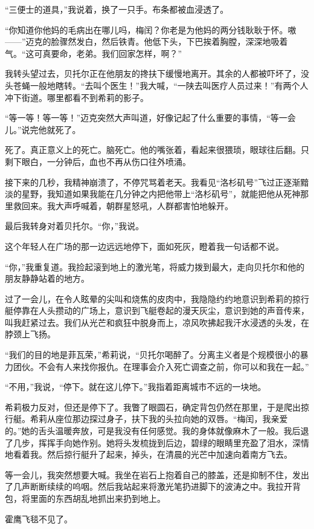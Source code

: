 \documentclass[AutoFakeBold=true]{book}
\begin{document}
``三便士的道具，''我说着，换了一只手。布条都被血浸透了。

``你知道你他妈的毛病出在哪儿吗，梅闰？你老是为他妈的两分钱耿耿于怀。嗷——''迈克的脸骤然发白，然后铁青。他低下头，下巴挨着胸膛，深深地吸着气。``这可真要命，老弟。我们回家怎样，啊？''

我转头望过去，贝托尔正在他朋友的搀扶下缓慢地离开。其余的人都被吓坏了，没头苍蝇一般地瞎转。``去叫个医生！''我大喊，``一陕去叫医疗人员过来！''有两个人冲下街道。哪里都看不到希莉的影子。

``等一等！等一等！''迈克突然大声叫道，好像记起了什么重要的事情，``等一会儿。''说完他就死了。

死了。真正意义上的死亡。脑死亡。他的嘴张着，看起来很猥琐，眼球往后翻。只剩下眼白，一分钟后，血也不再从伤口往外喷涌。

接下来的几秒，我精神崩溃了，不停咒骂着老天。我看见``洛杉矶号''飞过正逐渐黯淡的星野，我知道如果我能在几分钟之内把他带上``洛杉矶号''，就能把他从死神那里救回来。我大声呼喊着，朝群星怒吼，人群都害怕地躲开。

最后我转身对着贝托尔。``你，''我说。

这个年轻人在广场的那一边远远地停下，面如死灰，瞪着我一句话都不说。

``你，''我重复道。我捡起滚到地上的激光笔，将威力拨到最大，走向贝托尔和他的朋友静静站着的地方。

过了一会儿，在令人眩晕的尖叫和烧焦的皮肉中，我隐隐约约地意识到希莉的掠行艇停靠在人头攒动的广场上，意识到飞艇卷起的漫天灰尘，意识到她的声音传来，叫我赶紧过去。我们从光芒和疯狂中脱身而上，凉风吹拂起我汗水浸透的头发，在脖颈上飞扬。

``我们的目的地是菲瓦荣，''希莉说，``贝托尔喝醉了。分离主义者是个规模很小的暴力团伙。不会有人来找你报仇。在理事会介入死亡调查之前，你可以和我在一起。''

``不用，''我说，``停下。就在这儿停下。''我指着距离城市不远的一块地。

希莉极力反对，但还是停下了。我瞥了眼圆石，确定背包仍然在那里，于是爬出掠行艇。希莉从座位那边探过身子，扶下我的头拉向她的双唇。``梅闰，我亲爱的。''她的舌头温暖奔放，可是我没有任何感觉。我的身体就像麻木了一般。我后退了几步，挥挥手向她作别。她将头发梳拢到后边，碧绿的眼睛里充盈了泪水，深情地看着我。然后掠行艇升了起来，掉头，在清晨的光芒中加速向着南方飞去。

等一会儿，我突然想要大喊。我坐在岩石上抱着自己的膝盖，还是抑制不住，发出了几声断断续续的呜咽。然后我站起来将激光笔扔进脚下的波涛之中。我拉开背包，将里面的东西胡乱地抓出来扔到地上。

霍鹰飞毯不见了。
\end{document}
